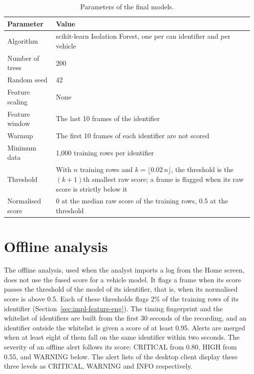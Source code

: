 \begin{table}[H]
\centering
\caption{Parameters of the final models.}
\label{tab:app-model-params}
\begin{tabularx}{\textwidth}{|P{4.2cm}|Y|}
\hline
\textbf{Parameter} & \textbf{Value} \\
\hline
Algorithm & scikit-learn Isolation Forest, one per \gls{can} identifier and per vehicle \\
\hline
Number of trees & 200 \\
\hline
Random seed & 42 \\
\hline
Feature scaling & None \\
\hline
Feature window & The last 10 frames of the identifier \\
\hline
Warmup & The first 10 frames of each identifier are not scored \\
\hline
Minimum data & 1{,}000 training rows per identifier \\
\hline
Threshold & With $n$ training rows and $k = \lfloor 0.02\,n \rfloor$, the threshold is the $(k+1)$th smallest raw score; a frame is flagged when its raw score is strictly below it \\
\hline
Normalised score & 0 at the median raw score of the training rows, 0.5 at the threshold \\
\hline
\end{tabularx}
\end{table}

\section{Offline analysis}

The offline analysis, used when the analyst imports a log from the Home screen, does not use the fused score for a vehicle model. It flags a frame when its score passes the threshold of the model of its identifier, that is, when its normalised score is above 0.5. Each of these thresholds flags 2\% of the training rows of its identifier (Section~\ref{sec:impl-feature-eng}). The timing fingerprint and the whitelist of identifiers are built from the first 30 seconds of the recording, and an identifier outside the whitelist is given a score of at least 0.95. Alerts are merged when at least eight of them fall on the same identifier within two seconds. The severity of an offline alert follows its score: CRITICAL from 0.80, HIGH from 0.55, and WARNING below. The alert lists of the desktop client display these three levels as CRITICAL, WARNING and INFO respectively.

